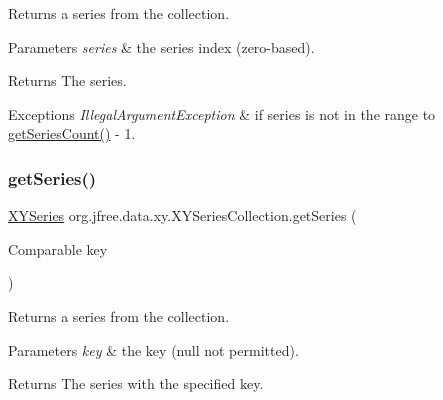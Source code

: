 Returns a series from the collection.


\begin{DoxyParams}{Parameters}
{\em series} & the series index (zero-\/based).\\
\hline
\end{DoxyParams}
\begin{DoxyReturn}{Returns}
The series.
\end{DoxyReturn}

\begin{DoxyExceptions}{Exceptions}
{\em Illegal\+Argument\+Exception} & if {\ttfamily series} is not in the range {} to {\ttfamily \mbox{\hyperlink{classorg_1_1jfree_1_1data_1_1xy_1_1_x_y_series_collection_ab50b1e302d11ddf25ef86dba1b2d4ffe}{get\+Series\+Count()}} -\/ 1}. \\
\hline
\end{DoxyExceptions}
\mbox{\label{classorg_1_1jfree_1_1data_1_1xy_1_1_x_y_series_collection_a8373546784da0578c0081c4c96a4225a}} 
\subsubsection{\texorpdfstring{get\+Series()}{getSeries()}\hspace{0.1cm}{\footnotesize\ttfamily [3/3]}}
{\footnotesize\ttfamily \mbox{\hyperlink{classorg_1_1jfree_1_1data_1_1xy_1_1_x_y_series}{X\+Y\+Series}} org.\+jfree.\+data.\+xy.\+X\+Y\+Series\+Collection.\+get\+Series (\begin{DoxyParamCaption}\item[{Comparable}]{key }\end{DoxyParamCaption})}

Returns a series from the collection.


\begin{DoxyParams}{Parameters}
{\em key} & the key ({\ttfamily null} not permitted).\\
\hline
\end{DoxyParams}
\begin{DoxyReturn}{Returns}
The series with the specified key.
\end{DoxyReturn}

